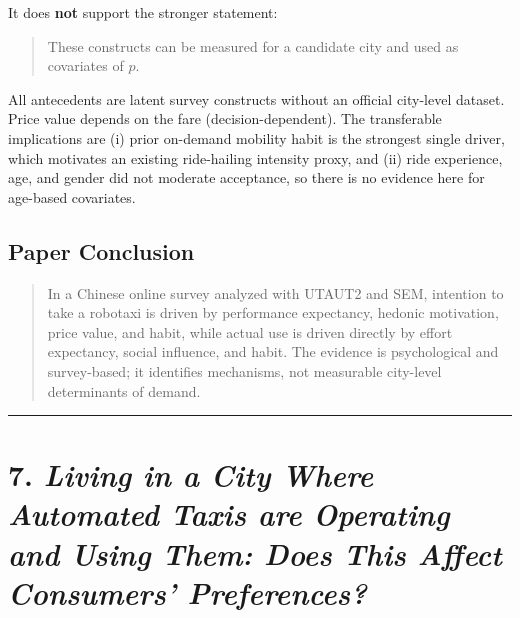 \documentclass[10pt,a4paper]{article}
\begin{document}
\begin{mdframed}[linecolor=red!60,linewidth=2pt]
It does \textbf{not} support the stronger statement:

\begin{quote}
These constructs can be measured for a candidate city and used as covariates of $p$.
\end{quote}

All antecedents are latent survey constructs without an official city-level dataset. Price value depends on the fare (decision-dependent). The transferable implications are (i) prior on-demand mobility habit is the strongest single driver, which motivates an existing ride-hailing intensity proxy, and (ii) ride experience, age, and gender did not moderate acceptance, so there is no evidence here for age-based covariates.

\hypertarget{paper-conclusion-5}{%
\subsection{Paper Conclusion}\label{paper-conclusion-5}}

\begin{quote}
In a Chinese online survey analyzed with UTAUT2 and SEM, intention to take a robotaxi is driven by performance expectancy, hedonic motivation, price value, and habit, while actual use is driven directly by effort expectancy, social influence, and habit. The evidence is psychological and survey-based; it identifies mechanisms, not measurable city-level determinants of demand.
\end{quote}

\begin{center}\rule{0.5\linewidth}{0.5pt}\end{center}

\hypertarget{living-in-a-city-where-automated-taxis-are-operating}{%
\section{\texorpdfstring{7. \emph{Living in a City Where Automated Taxis are Operating and Using Them: Does This Affect Consumers' Preferences?}}{7. Living in a City Where Automated Taxis are Operating and Using Them: Does This Affect Consumers' Preferences?}}\label{living-in-a-city-where-automated-taxis-are-operating}}


\end{mdframed}
\end{document}
